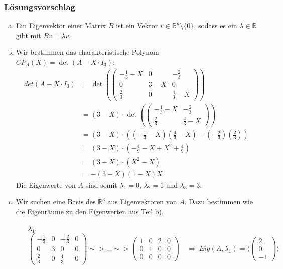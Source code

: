 \documentclass[a4paper,11pt]{scrartcl}
\newcommand{\RR}{\mathbb{R}}
\begin{document}
\subsubsection*{Lösungsvorschlag}
\begin{enumerate}[a)]
\item Ein Eigenvektor einer Matrix $B$ ist ein Vektor $v \in \RR^{n}\setminus \{0\}$, sodass es ein $\lambda \in \RR$ gibt mit $Bv=\lambda v$.
\item
Wir bestimmen das charakteristische Polynom $CP_A(X)=\det(A-X\cdot I_3)$:\\
\begin{align*}
det(A-X\cdot I_3)&=\det(\begin{pmatrix} -\frac{1}{3}-X & 0 & -\frac{2}{3} \\ 0 & 3-X & 0 \\ \frac{2}{3} & 0 &\frac{4}{3}-X \end{pmatrix})\\
&=(3-X)\cdot \det(\begin{pmatrix} -\frac{1}{3}-X &  -\frac{2}{3} \\ \frac{2}{3} &\frac{4}{3}-X \end{pmatrix})\\
&=(3-X)\cdot ((-\frac{1}{3}-X)(\frac{4}{3}-X)-(-\frac{2}{3})(\frac{2}{3}))\\
&=(3-X)\cdot(-\frac{4}{9}-X+X^2+\frac{4}{9})\\
&=(3-X)\cdot(X^2-X)\\
&=-(3-X)(1-X)X
\end{align*}
Die Eigenwerte von $A$ sind somit $\lambda_1=0$, $\lambda_2=1$ und $\lambda_3=3$.
\item Wir suchen eine Basis des $\RR^3$ aus Eigenvektoren von $A$. Dazu bestimmen wie die Eigenräume zu den Eigenwerten aus Teil b).
\begin{itemize}
\item[$\lambda_1$:] $\left(\begin{array}{ccc|c} -\frac{1}{3}&0& -\frac{2}{3}&0\\ 0&3&0&0\\ \frac{2}{3}&0&\frac{4}{3}&0\end{array} \right) \sim>...\sim>\left(\begin{array}{ccc|c} 1&0&2&0\\ 0&1&0&0\\ 0&0&0&0\end{array}\right) \quad \Rightarrow \  Eig(A,\lambda_1)=\langle \begin{pmatrix}2\\0\\-1 \end{pmatrix} \rangle$

\end{itemize}
\end{enumerate}
\end{document}

